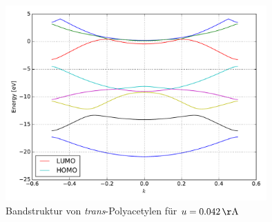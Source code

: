 \begin{frame}
\begin{figure}
	\centering
	\includegraphics[width = 10cm]{Images/polyacetylene/bands/bandstructure_manually_displaced}
	\caption{Bandstruktur von \emph{trans}-Polyacetylen für $u = \unit[0.042]{\AA}$}
	\label{image_manually_displaced_poly_bandstructure}
\end{figure}
\end{frame}